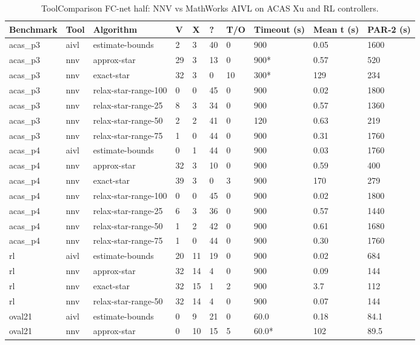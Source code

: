 \begin{table}[t]
\centering
\caption{ToolComparison FC-net half: NNV vs MathWorks AIVL on ACAS Xu and RL controllers.}
\label{tab:toolcomparison-acas-rl}
\begin{tabular}{llllllllll}
\toprule
Benchmark & Tool & Algorithm & V & X & ? & T/O & Timeout (s) & Mean t (s) & PAR-2 (s) \\
\midrule
acas_p3 & aivl & estimate-bounds & 2 & 3 & 40 & 0 & 900 & 0.05 & 1600 \\
acas_p3 & nnv & approx-star & 29 & 3 & 13 & 0 & 900* & 0.57 & 520 \\
acas_p3 & nnv & exact-star & 32 & 3 & 0 & 10 & 300* & 129 & 234 \\
acas_p3 & nnv & relax-star-range-100 & 0 & 0 & 45 & 0 & 900 & 0.02 & 1800 \\
acas_p3 & nnv & relax-star-range-25 & 8 & 3 & 34 & 0 & 900 & 0.57 & 1360 \\
acas_p3 & nnv & relax-star-range-50 & 2 & 2 & 41 & 0 & 120 & 0.63 & 219 \\
acas_p3 & nnv & relax-star-range-75 & 1 & 0 & 44 & 0 & 900 & 0.31 & 1760 \\
acas_p4 & aivl & estimate-bounds & 0 & 1 & 44 & 0 & 900 & 0.03 & 1760 \\
acas_p4 & nnv & approx-star & 32 & 3 & 10 & 0 & 900 & 0.59 & 400 \\
acas_p4 & nnv & exact-star & 39 & 3 & 0 & 3 & 900 & 170 & 279 \\
acas_p4 & nnv & relax-star-range-100 & 0 & 0 & 45 & 0 & 900 & 0.02 & 1800 \\
acas_p4 & nnv & relax-star-range-25 & 6 & 3 & 36 & 0 & 900 & 0.57 & 1440 \\
acas_p4 & nnv & relax-star-range-50 & 1 & 2 & 42 & 0 & 900 & 0.61 & 1680 \\
acas_p4 & nnv & relax-star-range-75 & 1 & 0 & 44 & 0 & 900 & 0.30 & 1760 \\
rl & aivl & estimate-bounds & 20 & 11 & 19 & 0 & 900 & 0.02 & 684 \\
rl & nnv & approx-star & 32 & 14 & 4 & 0 & 900 & 0.09 & 144 \\
rl & nnv & exact-star & 32 & 15 & 1 & 2 & 900 & 3.7 & 112 \\
rl & nnv & relax-star-range-50 & 32 & 14 & 4 & 0 & 900 & 0.07 & 144 \\
oval21 & aivl & estimate-bounds & 0 & 9 & 21 & 0 & 60.0 & 0.18 & 84.1 \\
oval21 & nnv & approx-star & 0 & 10 & 15 & 5 & 60.0* & 102 & 89.5 \\

\end{tabular}
\end{table}
